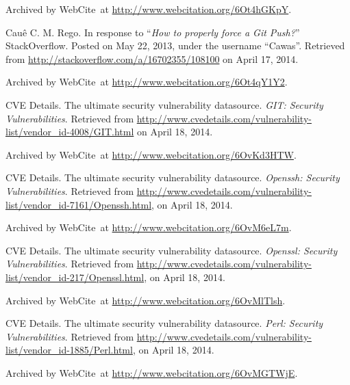 \begin{thebibliography}{9}
Archived by WebCite\textsuperscript{\textregistered}\ at
\url{http://www.webcitation.org/6Ot4hGKpY}.


Cauê C. M. Rego. In response to ``\emph{How to properly force a Git Push?}''
StackOverflow. Posted on May 22, 2013, under the username ``Cawas''.  Retrieved
from \url{http://stackoverflow.com/a/16702355/108100} on April 17, 2014.

Archived by WebCite\textsuperscript{\textregistered}\ at
\url{http://www.webcitation.org/6Ot4qY1Y2}.


CVE Details. The ultimate security vulnerability datasource. \emph{GIT:
Security Vulnerabilities}. Retrieved from
\url{http://www.cvedetails.com/vulnerability-list/vendor_id-4008/GIT.html} on
April 18, 2014.

Archived by WebCite\textsuperscript{\textregistered}\ at
\url{http://www.webcitation.org/6OvKd3HTW}.


CVE Details. The ultimate security vulnerability datasource. \emph{Openssh:
Security Vulnerabilities}. Retrieved from
\url{http://www.cvedetails.com/vulnerability-list/vendor_id-7161/Openssh.html},
on April 18, 2014.

Archived by WebCite\textsuperscript{\textregistered}\ at
\url{http://www.webcitation.org/6OvM6eL7m}.


CVE Details. The ultimate security vulnerability datasource. \emph{Openssl:
Security Vulnerabilities}. Retrieved from
\url{http://www.cvedetails.com/vulnerability-list/vendor_id-217/Openssl.html},
on April 18, 2014.

Archived by WebCite\textsuperscript{\textregistered}\ at
\url{http://www.webcitation.org/6OvMlTlsh}.


CVE Details. The ultimate security vulnerability datasource. \emph{Perl:
Security Vulnerabilities}. Retrieved from
\url{http://www.cvedetails.com/vulnerability-list/vendor_id-1885/Perl.html}, on
April 18, 2014.

Archived by WebCite\textsuperscript{\textregistered}\ at
\url{http://www.webcitation.org/6OvMGTWjE}.



\end{thebibliography}
